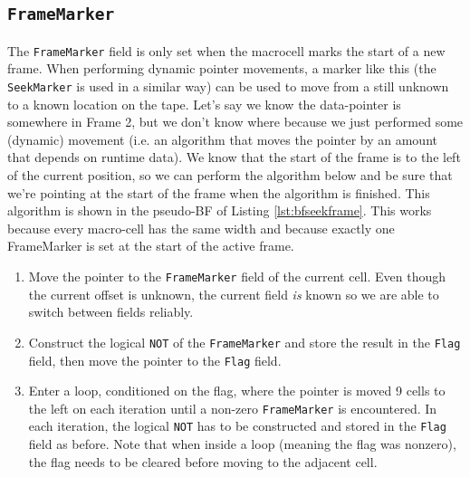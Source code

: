 \subsection{\texttt{FrameMarker}}
The \texttt{FrameMarker} field is only set when the macrocell marks the start of a new frame. When performing dynamic pointer movements, a marker like this (the \texttt{SeekMarker} is used in a similar way) can be used to move from a still unknown to a known location on the tape. Let's say we know the data-pointer is somewhere in Frame 2, but we don't know where because we just performed some (dynamic) movement (i.e. an algorithm that moves the pointer by an amount that depends on runtime data). We know that the start of the frame is to the left of the current position, so we can perform the algorithm below and be sure that we're pointing at the start of the frame when the algorithm is finished. This algorithm is shown in the pseudo-BF of Listing \ref{lst:bfseekframe}. This works because every macro-cell has the same width and because exactly one FrameMarker is set at the start of the active frame.

\begin{enumerate}
\item Move the pointer to the \texttt{FrameMarker} field of the current cell. Even though the current offset is unknown, the current field \emph{is} known so we are able to switch between fields reliably.
\item Construct the logical \texttt{NOT} of the \texttt{FrameMarker} and store the result in the \texttt{Flag} field, then move the pointer to the \texttt{Flag} field.
\item Enter a loop, conditioned on the flag, where the pointer is moved 9 cells to the left on each iteration until a non-zero \texttt{FrameMarker} is encountered. In each iteration, the logical \texttt{NOT} has to be constructed and stored in the \texttt{Flag} field as before. Note that when inside a loop (meaning the flag was nonzero), the flag needs to be cleared before moving to the adjacent cell.
\end{enumerate}


